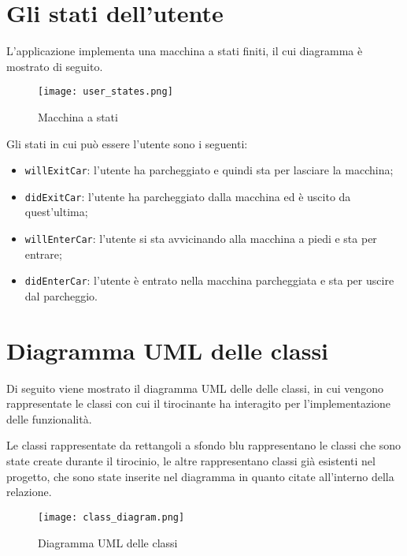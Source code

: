 \pagebreak


\hypertarget{gli-stati-dellutente}{%
\section{Gli stati dell'utente}\label{gli-stati-dellutente}}

L'applicazione implementa una macchina a stati finiti, il cui diagramma è mostrato di seguito.

\begin{figure}[H]
\centering
\texttt{[image: user\_states.png]}
\caption{Macchina a stati}
\end{figure}

Gli stati in cui può essere l'utente sono i seguenti:

\begin{itemize}
    \item \texttt{willExitCar}: l'utente ha parcheggiato e quindi sta per lasciare la macchina;
    \item \texttt{didExitCar}: l'utente ha parcheggiato dalla macchina ed è uscito da quest'ultima;
    \item \texttt{willEnterCar}: l'utente si sta avvicinando alla macchina a piedi e sta per entrare;
    \item \texttt{didEnterCar}: l'utente è entrato nella macchina parcheggiata e sta per uscire dal parcheggio.
\end{itemize}

\hypertarget{diagramma-uml-delle-classi}{%
\section{Diagramma UML delle classi}\label{diagramma-uml-delle-classi}}

Di seguito viene mostrato il diagramma UML delle delle classi, in cui vengono rappresentate le classi con cui il tirocinante ha interagito per l'implementazione delle funzionalità.

Le classi rappresentate da rettangoli a sfondo blu rappresentano le classi che sono state create durante il tirocinio, le altre rappresentano classi già esistenti nel progetto, che sono state inserite nel diagramma in quanto citate all'interno della relazione.

\begin{figure}[H]
\centering
\texttt{[image: class\_diagram.png]}
\caption{Diagramma UML delle classi}
\end{figure}

